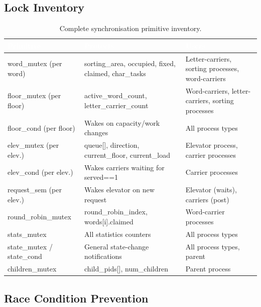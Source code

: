 \documentclass[12pt,a4paper]{article}
\begin{document}
\subsection{Lock Inventory}

\begin{table}[htbp]
\centering
\small
\caption{Complete synchronisation primitive inventory.}
\begin{tabularx}{\textwidth}{>{\ttfamily\small}l l X}
\toprule
\rowcolor{darkblue}
\textcolor{white}{Primitive} &
\textcolor{white}{Protects} &
\textcolor{white}{Users} \\
\midrule
word\_mutex (per word) &
  sorting\_area, occupied, fixed, claimed, char\_tasks &
  Letter-carriers, sorting processes, word-carriers \\
\rowcolor{rowgray}
floor\_mutex (per floor) &
  active\_word\_count, letter\_carrier\_count &
  Word-carriers, letter-carriers, sorting processes \\
floor\_cond (per floor) &
  Wakes on capacity/work changes &
  All process types \\
\rowcolor{rowgray}
elev\_mutex (per elev.) &
  queue[], direction, current\_floor, current\_load &
  Elevator process, carrier processes \\
elev\_cond (per elev.) &
  Wakes carriers waiting for served==1 &
  Carrier processes \\
\rowcolor{rowgray}
request\_sem (per elev.) &
  Wakes elevator on new request &
  Elevator (waits), carriers (post) \\
round\_robin\_mutex &
  round\_robin\_index, words[i].claimed &
  Word-carrier processes \\
\rowcolor{rowgray}
stats\_mutex &
  All statistics counters &
  All process types \\
state\_mutex / state\_cond &
  General state-change notifications &
  All process types, parent \\
\rowcolor{rowgray}
children\_mutex &
  child\_pids[], num\_children &
  Parent process \\
\bottomrule
\end{tabularx}
\end{table}

\subsection{Race Condition Prevention}
\end{document}
